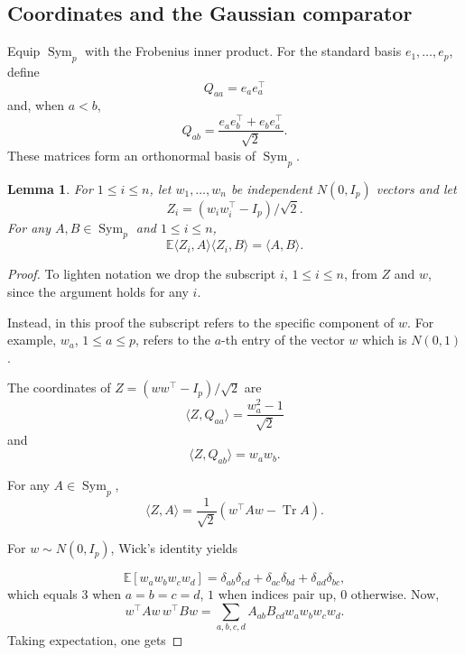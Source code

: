 \documentclass[11pt]{article}
\numberwithin{equation}{section}
\newtheorem{lemma}[theorem]{Lemma}
\theoremstyle{definition}
\theoremstyle{remark}
\newcommand{\E}{\mathbb E}
\newcommand{\1}{\boldsymbol 1}
\begin{document}
\begin{aiblock}
\subsection{Coordinates and the Gaussian comparator}\label{coordinates-and-the-gaussian-comparator}
Equip $\operatorname{Sym}_p$ with the Frobenius inner product. For the standard basis $e_1, \ldots, e_p$, define
\[
    Q_{aa} = e_a e_a^\top
\]
and, when $a < b$,
\[
    Q_{ab} = \frac{e_a e_b^\top + e_b e_a^\top}{\sqrt{2}}.
\]
These matrices form an orthonormal basis of $\operatorname{Sym}_p$.

\begin{lemma} \label{lem:infeasibility_above:wick}
    For $1 \leq i \leq n$, let $w_1, \ldots, w_n$ be independent $N(0,I_p)$ vectors and let
    \[
        Z_i = (w_i w_i^\top - I_p) / \sqrt{2}.
    \]
    For any $A, B \in \operatorname{Sym}_p$ and $1 \leq i \leq n$,
    \[
        \E \langle Z_i, A \rangle\langle Z_i, B \rangle = \langle A, B \rangle.
    \]
\end{lemma}
 

 
\begin{proof}

    To lighten notation we drop the subscript $i$, $1 \leq i \leq n$, from $Z$ and $w$, since the argument holds for any $i$.
    
    Instead, in this proof the subscript refers to the specific component of $w$. For example, $w_a$, $1 \leq a \leq p$, refers to the $a$-th entry of the vector $w$ which is $N(0, 1)$.

    The coordinates of $Z = (w w^\top - I_p) / \sqrt{2}$ are
    \[
        \langle Z, Q_{aa} \rangle = \frac{w_a^2 - 1}{\sqrt{2}}
    \]
    and
    \[
        \langle Z, Q_{ab} \rangle = w_a w_b.
    \]
    
    For any $A \in \operatorname{Sym}_p$,
    \[
        \langle Z, A \rangle = \frac{1}{\sqrt{2}}(w^\top A w - \operatorname{Tr} A).
    \]
    
    For $w \sim N(0, I_p)$, Wick's identity yields
      
    \[
        \E[w_a w_b w_c w_d] = \delta_{ab} \delta_{cd} + \delta_{ac} \delta_{bd} + \delta_{ad} \delta_{bc},
    \]
    which equals $3$ when $a = b = c = d$, $1$ when indices pair up, $0$ otherwise.
    Now,
    \[
        w^\top A w \, w^\top B w = \sum_{a,b,c,d} A_{ab} B_{cd} w_{a} w_{b} w_{c} w_{d}.
    \]
    Taking expectation, one gets
  

\end{proof}
\end{aiblock}
\end{document}
